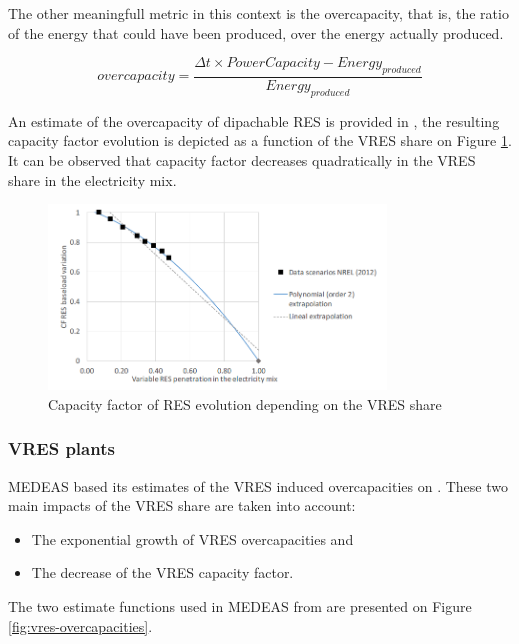 The other meaningfull metric in this context is the overcapacity, that is, the ratio of the energy that could have been produced, over the energy actually produced. %

\begin{equation}
    overcapacity = \frac{\Delta t \times PowerCapacity - Energy_{produced}}{Energy_{produced}}
    \label{equation:overcapacity}
\end{equation}

An estimate of the overcapacity of dipachable RES is provided in \cite{NREL}, the resulting capacity factor evolution is depicted as a function of the VRES share on Figure \ref{fig:cfres-vreshare}. It can be observed that capacity factor decreases quadratically in the VRES share in the electricity mix.

\begin{figure}[h]
    \includegraphics[width=0.8\textwidth]{resources/images/cfres-vreshsare.png}
    \caption{Capacity factor of RES evolution depending on the VRES share \cite{NREL}}
    \label{fig:cfres-vreshare}
\end{figure}

\subsubsection{VRES plants}

MEDEAS based its estimates of the VRES induced overcapacities on \cite{delarue}. These two main impacts of the VRES share are taken into account:
\begin{itemize}
    \item The exponential growth of VRES overcapacities and
    \item The decrease of the VRES capacity factor.
\end{itemize}

The two estimate functions used in MEDEAS \cite{medeas-eroi} from \cite{delarue} are presented on Figure \ref{fig:vres-overcapacities}.

